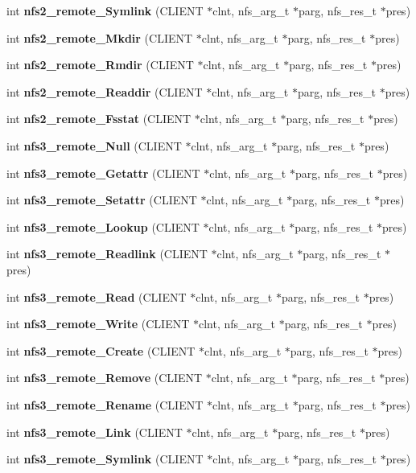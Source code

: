 \begin{CompactItemize}
int {\bf nfs2\_\-remote\_\-Symlink} (CLIENT $\ast$clnt, nfs\_\-arg\_\-t $\ast$parg, nfs\_\-res\_\-t $\ast$pres)
\item 
int {\bf nfs2\_\-remote\_\-Mkdir} (CLIENT $\ast$clnt, nfs\_\-arg\_\-t $\ast$parg, nfs\_\-res\_\-t $\ast$pres)
\item 
int {\bf nfs2\_\-remote\_\-Rmdir} (CLIENT $\ast$clnt, nfs\_\-arg\_\-t $\ast$parg, nfs\_\-res\_\-t $\ast$pres)
\item 
int {\bf nfs2\_\-remote\_\-Readdir} (CLIENT $\ast$clnt, nfs\_\-arg\_\-t $\ast$parg, nfs\_\-res\_\-t $\ast$pres)
\item 
int {\bf nfs2\_\-remote\_\-Fsstat} (CLIENT $\ast$clnt, nfs\_\-arg\_\-t $\ast$parg, nfs\_\-res\_\-t $\ast$pres)
\item 
int {\bf nfs3\_\-remote\_\-Null} (CLIENT $\ast$clnt, nfs\_\-arg\_\-t $\ast$parg, nfs\_\-res\_\-t $\ast$pres)
\item 
int {\bf nfs3\_\-remote\_\-Getattr} (CLIENT $\ast$clnt, nfs\_\-arg\_\-t $\ast$parg, nfs\_\-res\_\-t $\ast$pres)
\item 
int {\bf nfs3\_\-remote\_\-Setattr} (CLIENT $\ast$clnt, nfs\_\-arg\_\-t $\ast$parg, nfs\_\-res\_\-t $\ast$pres)
\item 
int {\bf nfs3\_\-remote\_\-Lookup} (CLIENT $\ast$clnt, nfs\_\-arg\_\-t $\ast$parg, nfs\_\-res\_\-t $\ast$pres)
\item 
int {\bf nfs3\_\-remote\_\-Readlink} (CLIENT $\ast$clnt, nfs\_\-arg\_\-t $\ast$parg, nfs\_\-res\_\-t $\ast$pres)
\item 
int {\bf nfs3\_\-remote\_\-Read} (CLIENT $\ast$clnt, nfs\_\-arg\_\-t $\ast$parg, nfs\_\-res\_\-t $\ast$pres)
\item 
int {\bf nfs3\_\-remote\_\-Write} (CLIENT $\ast$clnt, nfs\_\-arg\_\-t $\ast$parg, nfs\_\-res\_\-t $\ast$pres)
\item 
int {\bf nfs3\_\-remote\_\-Create} (CLIENT $\ast$clnt, nfs\_\-arg\_\-t $\ast$parg, nfs\_\-res\_\-t $\ast$pres)
\item 
int {\bf nfs3\_\-remote\_\-Remove} (CLIENT $\ast$clnt, nfs\_\-arg\_\-t $\ast$parg, nfs\_\-res\_\-t $\ast$pres)
\item 
int {\bf nfs3\_\-remote\_\-Rename} (CLIENT $\ast$clnt, nfs\_\-arg\_\-t $\ast$parg, nfs\_\-res\_\-t $\ast$pres)
\item 
int {\bf nfs3\_\-remote\_\-Link} (CLIENT $\ast$clnt, nfs\_\-arg\_\-t $\ast$parg, nfs\_\-res\_\-t $\ast$pres)
\item 
int {\bf nfs3\_\-remote\_\-Symlink} (CLIENT $\ast$clnt, nfs\_\-arg\_\-t $\ast$parg, nfs\_\-res\_\-t $\ast$pres)

\end{CompactItemize}
